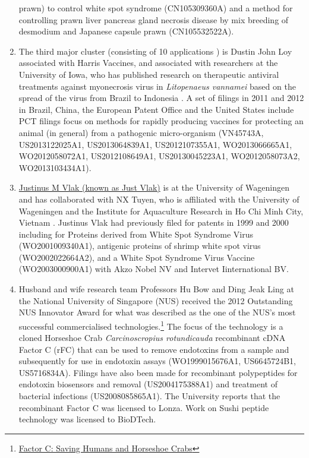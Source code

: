 \documentclass[]{book}
\theoremstyle{definition}
\theoremstyle{definition}
\theoremstyle{definition}
\theoremstyle{remark}
\begin{document}
\begin{enumerate}
  prawn) to control white spot syndrome (CN105309360A) and a method for
  controlling prawn liver pancreas gland necrosis disease by mix
  breeding of desmodium and Japanese capsule prawn (CN105532522A).
\item
  The third major cluster (consisting of 10 applications ) is Dustin
  John Loy associated with Harris Vaccines, and associated with
  researchers at the University of Iowa, who has published research on
  therapeutic antiviral treatments against myonecrosis virus in
  \emph{Litopenaeus vannamei} based on the spread of the virus from
  Brazil to Indonesia \citep{Loy_2012, Loy_2013}. A set of filings in
  2011 and 2012 in Brazil, China, the European Patent Office and the
  United States include PCT filings focus on methods for rapidly
  producing vaccines for protecting an animal (in general) from a
  pathogenic micro-organism (VN45743A, US2013122025A1, US2013064839A1,
  US2012107355A1, WO2013066665A1, WO2012058072A1, US2012108649A1,
  US20130045223A1, WO2012058073A2, WO2013103434A1).
\item
  \href{https://www.wur.nl/en/Persons/prof.dr.-JM-Just-Vlak.htm}{Justinus
  M Vlak (known as Just Vlak)} is at the University of Wageningen and
  has collaborated with NX Tuyen, who is affiliated with the University
  of Wageningen and the Institute for Aquaculture Research in Ho Chi
  Minh City, Vietnam \citep[see][]{Tuyen_2014}. Justinus Vlak had
  previously filed for patents in 1999 and 2000 including for Proteins
  derived from White Spot Syndrome Virus (WO2001009340A1), antigenic
  proteins of shrimp white spot virus (WO2002022664A2), and a White Spot
  Syndrome Virus Vaccine (WO2003000900A1) with Akzo Nobel NV and
  Intervet Iinternational BV.
\item
  Husband and wife research team Professors Hu Bow and Ding Jeak Ling at
  the National University of Singapore (NUS) received the 2012
  Outstanding NUS Innovator Award for what was described as the one of
  the NUS's most successful commercialised technologies.\footnote{\href{http://enterprise.nus.edu.sg/success-stories/detail/12}{Factor
    C: Saving Humans and Horseshoe Crabs}} The focus of the technology
  is a cloned Horseshoe Crab \emph{Carcinoscropius rotundicauda}
  recombinant cDNA Factor C (rFC) that can be used to remove endotoxins
  from a sample and subsequently for use in endotoxin assays
  (WO1999015676A1, US6645724B1, US5716834A). Filings have also been made
  for recombinant polypeptides for endotoxin biosensors and removal
  (US2004175388A1) and treatment of bacterial infections
  (US2008085865A1). The University reports that the recombinant Factor C
  was licensed to Lonza. Work on Sushi peptide technology was licensed
  to BioDTech.
\end{enumerate}
\end{document}
